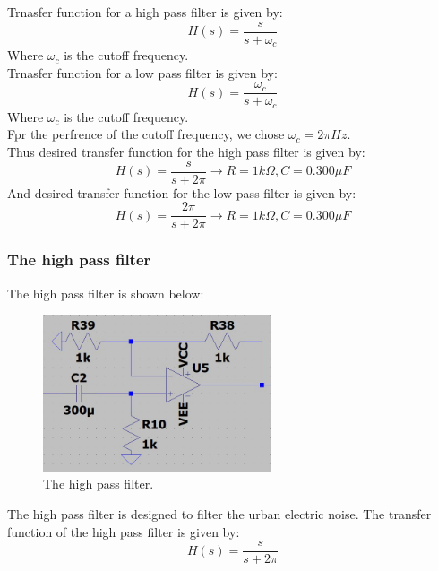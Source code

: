Trnasfer function for a high pass filter is given by:
\begin{equation}
    H(s) = \frac{s}{s + \omega_{c}}
\end{equation}
Where $\omega_{c}$ is the cutoff frequency.\\
Trnasfer function for a low pass filter is given by:
\begin{equation}
    H(s) = \frac{\omega_{c}}{s + \omega_{c}}
\end{equation}
Where $\omega_{c}$ is the cutoff frequency.\\
Fpr the perfrence of the cutoff frequency, we chose $\omega_{c} = 2 \pi Hz$.\\
Thus desired transfer function for the high pass filter is given by:
\begin{equation}
    H(s) = \frac{s}{s + 2 \pi} \rightarrow R = 1 k\Omega, C = 0.300 \mu F
\end{equation}
And desired transfer function for the low pass filter is given by:
\begin{equation}
    H(s) = \frac{2 \pi}{s + 2 \pi} \rightarrow R = 1 k\Omega, C = 0.300 \mu F
\end{equation}
\subsubsection{The high pass filter}
The high pass filter is shown below:
\begin{figure}[H]
    \centering
    \includegraphics[width=0.6\textwidth]{../Report/Figures/2.CircuitDesign/HighPassFilter.jpg}
    \caption{The high pass filter.}
\end{figure}
The high pass filter is designed to filter the urban electric noise. The transfer function of the high pass filter is given by:
\begin{equation}
    H(s) = \frac{s}{s + 2 \pi}
\end{equation}

